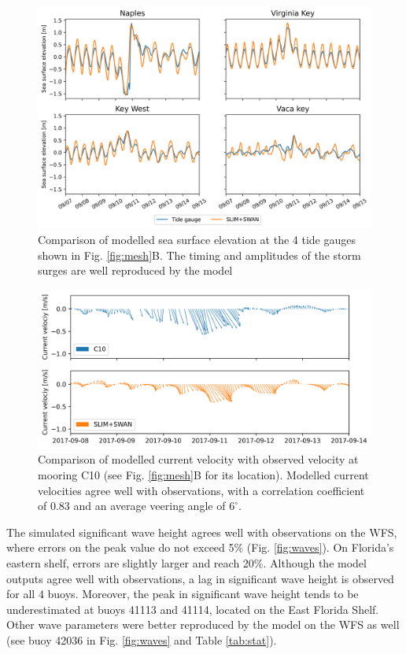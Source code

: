 \documentclass[preprint,12pt,authoryear]{elsarticle}
\begin{document}
\begin{figure}
    \centering
    \includegraphics[width=\textwidth]{fig/elevation_with_map.png}
    \caption{Comparison of modelled sea surface elevation at the 4 tide gauges shown in Fig. \ref{fig:mesh}B. The timing and amplitudes of the storm surges are well reproduced by the model}
    \label{fig:sse}
\end{figure}
\begin{figure}
    \includegraphics[width=\textwidth]{fig/validation_currents_C10_ww3.png}
    \caption{Comparison of modelled current velocity with observed velocity at mooring C10 (see Fig. \ref{fig:mesh}B for its location). Modelled current velocities agree well with observations, with a correlation coefficient of 0.83 and an average veering angle of $6^\circ$.}
    \label{fig:uv}
\end{figure}

The simulated significant wave height agrees well with observations on the WFS, where errors on the peak value do not exceed 5\% (Fig. \ref{fig:waves}). On Florida's eastern shelf, errors are slightly larger and reach 20\%. Although the model outputs agree well with observations, a lag in significant wave height is observed for all 4 buoys. Moreover, the peak in significant wave height tends to be underestimated at buoys 41113 and 41114, located on the East Florida Shelf. Other wave parameters were better reproduced by the model on the WFS as well (see buoy 42036 in Fig. \ref{fig:waves} and Table \ref{tab:stat}). 
\end{document}
